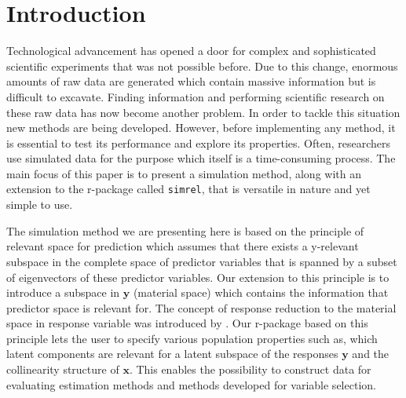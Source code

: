 \documentclass[review]{elsarticle}
\theoremstyle{definition}
\theoremstyle{definition}
\theoremstyle{definition}
\theoremstyle{remark}
\begin{document}
\section{Introduction}\label{introduction}

Technological advancement has opened a door for complex and
sophisticated scientific experiments that was not possible before. Due
to this change, enormous amounts of raw data are generated which contain
massive information but is difficult to excavate. Finding information
and performing scientific research on these raw data has now become
another problem. In order to tackle this situation new methods are being
developed. However, before implementing any method, it is essential to
test its performance and explore its properties. Often, researchers use
simulated data for the purpose which itself is a time-consuming process.
The main focus of this paper is to present a simulation method, along
with an extension to the r-package called \texttt{simrel}, that is
versatile in nature and yet simple to use.

The simulation method we are presenting here is based on the principle
of relevant space for prediction \citep{helland1994comparison} which
assumes that there exists a y-relevant subspace in the complete space of
predictor variables that is spanned by a subset of eigenvectors of these
predictor variables. Our extension to this principle is to introduce a
subspace in \(\mathbf{y}\) (material space) which contains the
information that predictor space is relevant for. The concept of
response reduction to the material space in response variable was
introduced by \citet{cook2010envelope}. Our r-package based on this
principle lets the user to specify various population properties such
as, which latent components are relevant for a latent subspace of the
responses \(\mathbf{y}\) and the collinearity structure of
\(\mathbf{x}\). This enables the possibility to construct data for
evaluating estimation methods and methods developed for variable
selection.
\end{document}
